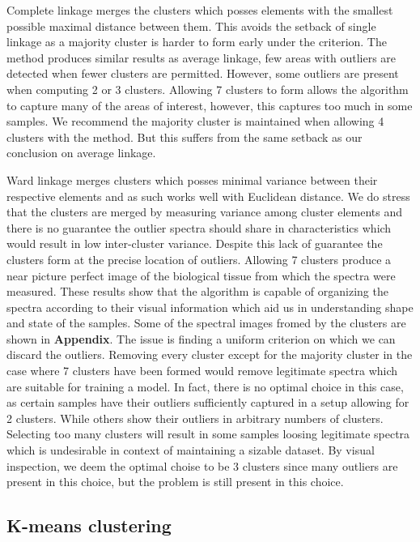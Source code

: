Complete linkage merges the clusters which posses elements with the smallest possible maximal distance between them. This avoids the setback of single linkage as a majority cluster is harder to form early under the criterion. The method produces similar results as average linkage, few areas with outliers are detected when fewer clusters are permitted. However, some outliers are present when computing 2 or 3 clusters. Allowing 7 clusters to form allows the algorithm to capture many of the areas of interest, however, this captures too much in some samples. We recommend the majority cluster is maintained when allowing 4 clusters with the method. But this suffers from the same setback as our conclusion on average linkage.

Ward linkage merges clusters which posses minimal variance between their respective elements and as such works well with Euclidean distance. We do stress that the clusters are merged by measuring variance among cluster elements and there is no guarantee the outlier spectra should share in characteristics which would result in low inter-cluster variance. Despite this lack of guarantee the clusters form at the precise location of outliers. Allowing 7 clusters produce a near picture perfect image of the biological tissue from which the spectra were measured. These results show that the algorithm is capable of organizing the spectra according to their visual information which aid us in understanding shape and state of the samples. Some of the spectral images fromed by the clusters are shown in \textbf{Appendix}. The issue is finding a uniform criterion on which we can discard the outliers. Removing every cluster except for the majority cluster in the case where 7 clusters have been formed would remove legitimate spectra which are suitable for training a model. In fact, there is no optimal choice in this case, as certain samples have their outliers sufficiently captured in a setup allowing for 2 clusters. While others show their outliers in arbitrary numbers of clusters. Selecting too many clusters will result in some samples loosing legitimate spectra which is undesirable in context of maintaining a sizable dataset. By visual inspection, we deem the optimal choise to be 3 clusters since many outliers are present in this choice, but the problem is still present in this choice.

\subsection{K-means clustering}


